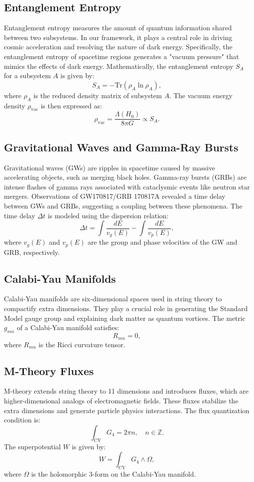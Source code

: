 \documentclass[12pt, a4paper]{article}
\begin{document}
\subsection{Entanglement Entropy}
Entanglement entropy measures the amount of quantum information shared between two subsystems. In our framework, it plays a central role in driving cosmic acceleration and resolving the nature of dark energy. Specifically, the entanglement entropy of spacetime regions generates a "vacuum pressure" that mimics the effects of dark energy. Mathematically, the entanglement entropy \(S_A\) for a subsystem \(A\) is given by:
\[
S_A = -\text{Tr}(\rho_A \ln \rho_A),
\]
where \(\rho_A\) is the reduced density matrix of subsystem \(A\). The vacuum energy density \(\rho_{\text{vac}}\) is then expressed as:
\[
\rho_{\text{vac}} = \frac{\Lambda(H_0)}{8\pi G} \propto S_A.
\]

\subsection{Gravitational Waves and Gamma-Ray Bursts}
Gravitational waves (GWs) are ripples in spacetime caused by massive accelerating objects, such as merging black holes. Gamma-ray bursts (GRBs) are intense flashes of gamma rays associated with cataclysmic events like neutron star mergers. Observations of GW170817/GRB 170817A revealed a time delay between GWs and GRBs, suggesting a coupling between these phenomena. The time delay \(\Delta t\) is modeled using the dispersion relation:
\[
\Delta t = \int \frac{dE}{v_g(E)} - \int \frac{dE}{v_p(E)},
\]
where \(v_g(E)\) and \(v_p(E)\) are the group and phase velocities of the GW and GRB, respectively.

\subsection{Calabi-Yau Manifolds}
Calabi-Yau manifolds are six-dimensional spaces used in string theory to compactify extra dimensions. They play a crucial role in generating the Standard Model gauge group and explaining dark matter as quantum vortices. The metric \(g_{mn}\) of a Calabi-Yau manifold satisfies:
\[
R_{mn} = 0,
\]
where \(R_{mn}\) is the Ricci curvature tensor.

\subsection{M-Theory Fluxes}
M-theory extends string theory to 11 dimensions and introduces fluxes, which are higher-dimensional analogs of electromagnetic fields. These fluxes stabilize the extra dimensions and generate particle physics interactions. The flux quantization condition is:
\[
\int_{\text{CY}} G_4 = 2\pi n, \quad n \in \mathbb{Z}.
\]
The superpotential \(W\) is given by:
\[
W = \int_{\text{CY}} G_4 \wedge \Omega,
\]
where \(\Omega\) is the holomorphic 3-form on the Calabi-Yau manifold.
\end{document}

